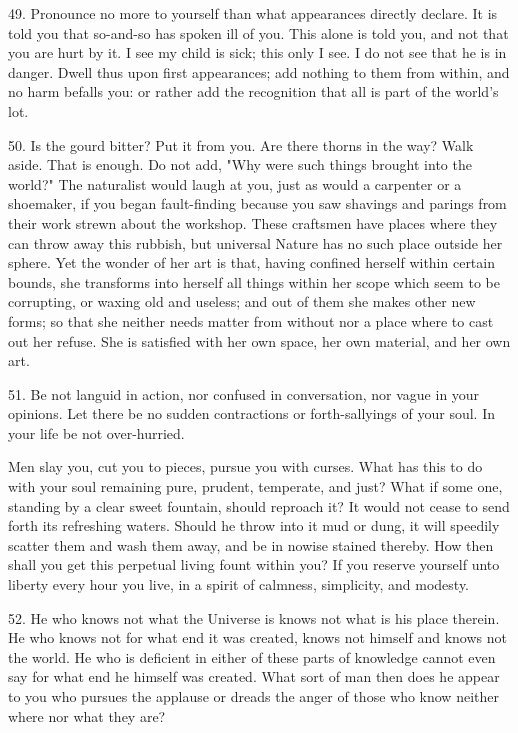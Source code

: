 \documentclass{book}
\begin{document}
49. Pronounce no more to yourself than what appearances directly
declare. It is told you that so-and-so has spoken ill of you. This
alone is told you, and not that you are hurt by it. I see my child is
sick; this only I see. I do not see that he is in danger. Dwell thus
upon first appearances; add nothing to them from within, and no harm
befalls you: or rather add the recognition that all is part of the
world's lot.

50. Is the gourd bitter? Put it from you. Are there thorns in the way?
Walk aside. That is enough. Do not add, "Why were such things brought
into the world?" The naturalist would laugh at you, just as would a
carpenter or a shoemaker, if you began fault-finding because you saw
shavings and parings from their work strewn about the workshop. These
craftsmen have places where they can throw away this rubbish, but
universal Nature has no such place outside her sphere. Yet the wonder
of her art is that, having confined herself within certain bounds, she
transforms into herself all things within her scope which seem to be
corrupting, or waxing old and useless; and out of them she makes other
new forms; so that she neither needs matter from without nor a place
where to cast out her refuse. She is satisfied with her own space, her
own material, and her own art.

51. Be not languid in action, nor confused in conversation, nor vague
in your opinions. Let there be no sudden contractions or
forth-sallyings of your soul. In your life be not over-hurried.

Men slay you, cut you to pieces, pursue you with curses. What has this
to do with your soul remaining pure, prudent, temperate, and just?
What if some one, standing by a clear sweet fountain, should reproach
it? It would not cease to send forth its refreshing waters. Should he
throw into it mud or dung, it will speedily scatter them and wash them
away, and be in nowise stained thereby. How then shall you get this
perpetual living fount within you? If you reserve yourself unto
liberty every hour you live, in a spirit of calmness, simplicity, and
modesty.

52. He who knows not what the Universe is knows not what is his place
therein. He who knows not for what end it was created, knows not
himself and knows not the world. He who is deficient in either of
these parts of knowledge cannot even say for what end he himself was
created. What sort of man then does he appear to you who pursues the
applause or dreads the anger of those who know neither where nor what
they are?
\end{document}
